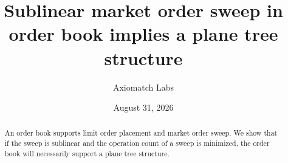 \documentclass[11pt]{article}
\title{Sublinear market order sweep in order book implies a plane tree structure}
\author{Axiomatch Labs}
\date{August 31, 2026}
\begin{document}
\maketitle

\begin{abstract}
    An order book supports limit order placement and market order sweep. We show that if the sweep is sublinear and the operation count of a sweep is minimized, the order book will necessarily support a plane tree structure.
\end{abstract}







\printbibliography

\end{document}
